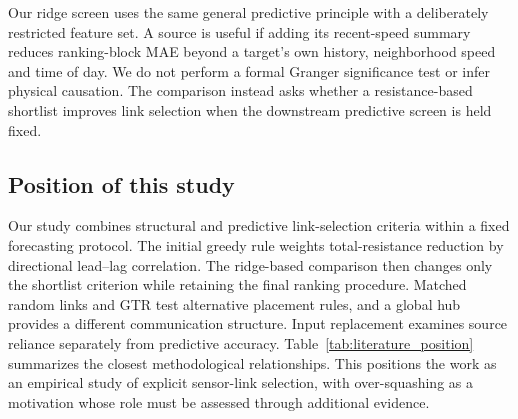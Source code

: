Our ridge screen uses the same general predictive principle with a deliberately restricted feature set. A source is useful if adding its recent-speed summary reduces ranking-block MAE beyond a target's own history, neighborhood speed and time of day. We do not perform a formal Granger significance test or infer physical causation. The comparison instead asks whether a resistance-based shortlist improves link selection when the downstream predictive screen is held fixed.

\subsection{Position of this study}
Our study combines structural and predictive link-selection criteria within a fixed forecasting protocol. The initial greedy rule weights total-resistance reduction by directional lead--lag correlation. The ridge-based comparison then changes only the shortlist criterion while retaining the final ranking procedure. Matched random links and GTR test alternative placement rules, and a global hub provides a different communication structure. Input replacement examines source reliance separately from predictive accuracy. Table~\ref{tab:literature_position} summarizes the closest methodological relationships. This positions the work as an empirical study of explicit sensor-link selection, with over-squashing as a motivation whose role must be assessed through additional evidence.

